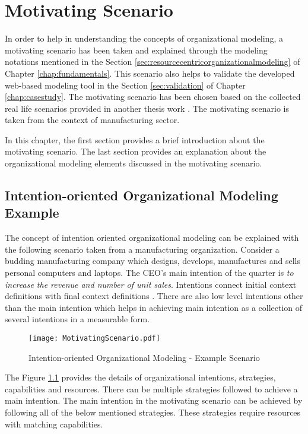\chapter{Motivating Scenario}
\label{chap:motivatingScenario}
In order to help in understanding the concepts of organizational modeling, a motivating scenario has been taken and explained through the modeling notations mentioned in the Section \ref{sec:resourcecentricorganizationalmodeling} of Chapter \ref{chap:fundamentals}. This scenario also helps to validate the developed web-based modeling tool in the Section \ref{sec:validation} of Chapter \ref{chap:casestudy}. The motivating scenario has been chosen based on the collected real life scenarios provided in another thesis work \cite{Sierr2015}. The motivating scenario is taken from the context of manufacturing sector. 

In this chapter, the first section provides a brief introduction about the motivating scenario. The last section provides an explanation about the organizational modeling elements discussed in the motivating scenario. 
\section{Intention-oriented Organizational Modeling Example}
\label{sec:scenario}
The concept of intention oriented organizational modeling can be explained with the following scenario taken from a manufacturing organization. Consider a budding manufacturing company which designs, develops, manufactures and sells personal computers and laptops. The CEO's main intention of the quarter is \textit{to increase the revenue and number of unit sales}. Intentions connect initial context definitions with final context definitions \cite{Sungur2014a}. There are also low level intentions other than the main intention which helps in achieving main intention as a collection of several intentions in a measurable form. 
 
\begin{figure}
  	\centering
  	\texttt{[image: MotivatingScenario.pdf]}
  	\caption{Intention-oriented Organizational Modeling - Example Scenario}
  	\label{fig:motivatingscenario}
\end{figure}
  
The Figure \ref{fig:motivatingscenario} provides the details of organizational intentions, strategies, capabilities and resources. There can be multiple strategies followed to achieve a main intention. The main intention in the motivating scenario can be achieved by following all of the below mentioned strategies. These strategies require resources with matching capabilities.
 
